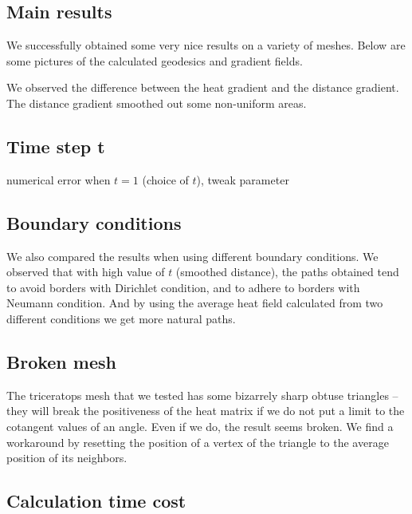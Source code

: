 \documentclass[a4paper,12pt,twoside]{article}
\begin{document}
\subsection{Main results}

We successfully obtained some very nice results on a variety of meshes. Below are some pictures of the calculated geodesics and gradient fields.


We observed the difference between the heat gradient and the distance gradient. The distance gradient smoothed out some non-uniform areas.

\subsection{Time step t}

numerical error when $t = 1$ (choice of $t$), tweak parameter

\subsection{Boundary conditions}

We also compared the results when using different boundary conditions. We observed that with high value of $t$ (smoothed distance), the paths obtained tend to avoid borders with Dirichlet condition, and to adhere to borders with Neumann condition. And by using the average heat field calculated from two different conditions we get more natural paths.

\subsection{Broken mesh}

The triceratops mesh that we tested has some bizarrely sharp obtuse triangles – they will break the positiveness of the heat matrix if we do not put a limit to the cotangent values of an angle. Even if we do, the result seems broken. We find a workaround by resetting the position of a vertex of the triangle to the average position of its neighbors.

\subsection{Calculation time cost}
\end{document}
